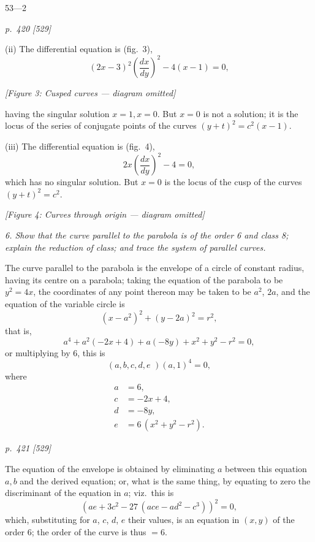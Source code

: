 \documentclass[11pt,a4paper]{book}
\begin{document}
\bigskip
\hfill{\small 53---2}

\clearpage

\bigskip
\textit{p.~420 [529]}
\smallskip

(ii) The differential equation is (fig.~3),
\[
(2x - 3)^2\left(\frac{dx}{dy}\right)^2 - 4(x - 1) = 0,
\]
\begin{center}
\textit{[Figure 3: Cusped curves --- diagram omitted]}
\end{center}

\noindent
having the singular solution $x = 1, x = 0$. But $x = 0$ is not a solution; it is the locus of the series of conjugate points of the curves $(y + t)^2 = c^2(x - 1)$.

(iii) The differential equation is (fig.~4),
\[
2x\left(\frac{dx}{dy}\right)^2 - 4 = 0,
\]
which has no singular solution. But $x = 0$ is the locus of the cusp of the curves $(y + t)^2 = c^2$.

\begin{center}
\textit{[Figure 4: Curves through origin --- diagram omitted]}
\end{center}

\textit{6. Show that the curve parallel to the parabola is of the order 6 and class 8; explain the reduction of class; and trace the system of parallel curves.}

The curve parallel to the parabola is the envelope of a circle of constant radius, having its centre on a parabola; taking the equation of the parabola to be $y^2 = 4x$, the coordinates of any point thereon may be taken to be $a^2$, $2a$, and the equation of the variable circle is
\[
(x - a^2)^2 + (y - 2a)^2 = r^2,
\]
that is,
\[
a^4 + a^2(- 2x + 4) + a(- 8y) + x^2 + y^2 - r^2 = 0,
\]
or multiplying by 6, this is
\[
(a, b, c, d, e\!\!\!\!\!\,\,)(a, 1)^4 = 0,
\]
where
\begin{align*}
a &= 6,\\
c &= - 2x + 4,\\
d &= - 8y,\\
e &= 6\,(x^2 + y^2 - r^2).
\end{align*}

\clearpage

\bigskip
\textit{p.~421 [529]}
\smallskip

The equation of the envelope is obtained by eliminating $a$ between this equation
$a, b$ and the derived equation; or, what is the same thing, by equating to zero the
discriminant of the equation in $a$; viz.\ this is
\[
(ae + 3c^2 - 27\,(ace - ad^2 - c^3))^2 = 0,
\]
which, substituting for $a$, $c$, $d$, $e$ their values, is an equation in $(x, y)$ of the order 6;
the order of the curve is thus $= 6$.
\end{document}
